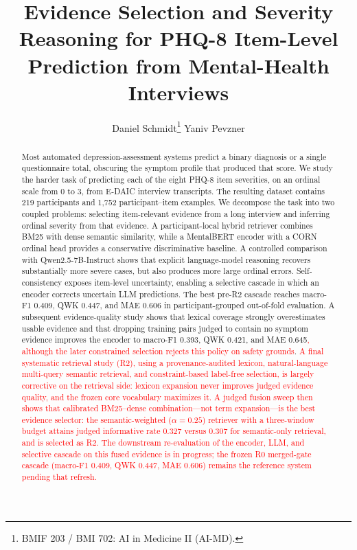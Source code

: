 \documentclass{article}
\title{Evidence Selection and Severity Reasoning for PHQ-8 Item-Level Prediction from Mental-Health Interviews}
\author{%
  Daniel Schmidt\thanks{BMIF 203 / BMI 702: AI in Medicine II (AI-MD).}
  \And
  Yaniv Pevzner
}
\DeclareRobustCommand{\rev}[1]{\textcolor{red}{#1}}
\begin{document}
\maketitle

\begin{abstract}
Most automated depression-assessment systems predict a binary diagnosis or a single questionnaire total, obscuring the symptom profile that produced that score. We study the harder task of predicting each of the eight PHQ-8 item severities, on an ordinal scale from 0 to 3, from E-DAIC interview transcripts. The resulting dataset contains 219 participants and 1,752 participant--item examples. We decompose the task into two coupled problems: selecting item-relevant evidence from a long interview and inferring ordinal severity from that evidence. A participant-local hybrid retriever combines BM25 with dense semantic similarity, while a MentalBERT encoder with a CORN ordinal head provides a conservative discriminative baseline. A controlled comparison with Qwen2.5-7B-Instruct shows that explicit language-model reasoning recovers substantially more severe cases, but also produces more large ordinal errors. Self-consistency exposes item-level uncertainty, enabling a selective cascade in which an encoder corrects uncertain LLM predictions. The best pre-R2 cascade reaches macro-F1 0.409, QWK 0.447, and MAE 0.606 in participant-grouped out-of-fold evaluation. A subsequent evidence-quality study shows that lexical coverage strongly overestimates usable evidence and that dropping training pairs judged to contain no symptom evidence improves the encoder to macro-F1 0.393, QWK 0.421, and MAE 0.645\rev{, although the later constrained selection rejects this policy on safety grounds}. \rev{A final systematic retrieval study (R2), using a provenance-audited lexicon, natural-language multi-query semantic retrieval, and constraint-based label-free selection, is largely corrective on the retrieval side: lexicon expansion never improves judged evidence quality, and the frozen core vocabulary maximizes it. A judged fusion sweep then shows that calibrated BM25--dense combination---not term expansion---is the best evidence selector: the semantic-weighted ($\alpha=0.25$) retriever with a three-window budget attains judged informative rate 0.327 versus 0.307 for semantic-only retrieval, and is selected as R2. The downstream re-evaluation of the encoder, LLM, and selective cascade on this fused evidence is in progress; the frozen R0 merged-gate cascade (macro-F1 0.409, QWK 0.447, MAE 0.606) remains the reference system pending that refresh.}
\end{abstract}
\end{document}
